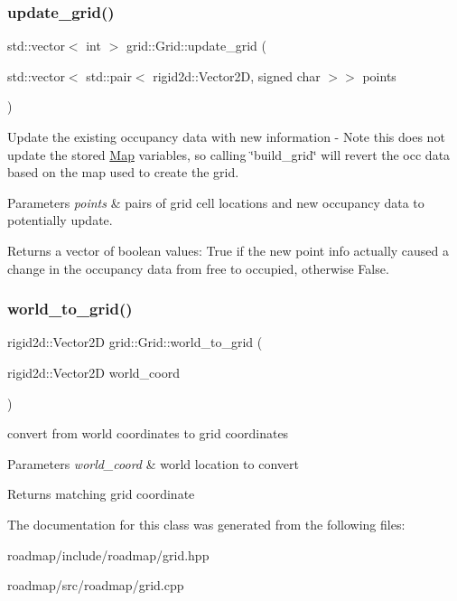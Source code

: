 \subsubsection{\texorpdfstring{update\+\_\+grid()}{update\_grid()}}
{\footnotesize\ttfamily std\+::vector$<$ int $>$ grid\+::\+Grid\+::update\+\_\+grid (\begin{DoxyParamCaption}\item[{std\+::vector$<$ std\+::pair$<$ rigid2d\+::\+Vector2D, signed char $>$$>$}]{points }\end{DoxyParamCaption})}



Update the existing occupancy data with new information -\/ Note this does not update the stored \hyperlink{structgrid_1_1Map}{Map} variables, so calling \char`\"{}build\+\_\+grid\char`\"{} will revert the occ data based on the map used to create the grid. 


\begin{DoxyParams}{Parameters}
{\em points} & pairs of grid cell locations and new occupancy data to potentially update. \\
\hline
\end{DoxyParams}
\begin{DoxyReturn}{Returns}
a vector of boolean values\+: True if the new point info actually caused a change in the occupancy data from free to occupied, otherwise False. 
\end{DoxyReturn}
\mbox{\label{classgrid_1_1Grid_a9aeb33485b294ab4a07178359db6e3cf}} 
\subsubsection{\texorpdfstring{world\+\_\+to\+\_\+grid()}{world\_to\_grid()}}
{\footnotesize\ttfamily rigid2d\+::\+Vector2D grid\+::\+Grid\+::world\+\_\+to\+\_\+grid (\begin{DoxyParamCaption}\item[{rigid2d\+::\+Vector2D}]{world\+\_\+coord }\end{DoxyParamCaption})}



convert from world coordinates to grid coordinates 


\begin{DoxyParams}{Parameters}
{\em world\+\_\+coord} & world location to convert \\
\hline
\end{DoxyParams}
\begin{DoxyReturn}{Returns}
matching grid coordinate 
\end{DoxyReturn}


The documentation for this class was generated from the following files\+:\begin{DoxyCompactItemize}
\item 
roadmap/include/roadmap/grid.\+hpp\item 
roadmap/src/roadmap/grid.\+cpp\end{DoxyCompactItemize}
